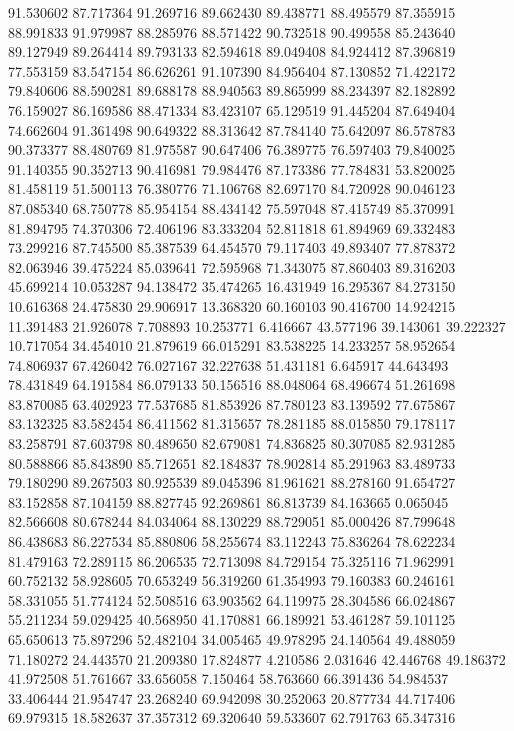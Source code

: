 91.530602
87.717364
91.269716
89.662430
89.438771
88.495579
87.355915
88.991833
91.979987
88.285976
88.571422
90.732518
90.499558
85.243640
89.127949
89.264414
89.793133
82.594618
89.049408
84.924412
87.396819
77.553159
83.547154
86.626261
91.107390
84.956404
87.130852
71.422172
79.840606
88.590281
89.688178
88.940563
89.865999
88.234397
82.182892
76.159027
86.169586
88.471334
83.423107
65.129519
91.445204
87.649404
74.662604
91.361498
90.649322
88.313642
87.784140
75.642097
86.578783
90.373377
88.480769
81.975587
90.647406
76.389775
76.597403
79.840025
91.140355
90.352713
90.416981
79.984476
87.173386
77.784831
53.820025
81.458119
51.500113
76.380776
71.106768
82.697170
84.720928
90.046123
87.085340
68.750778
85.954154
88.434142
75.597048
87.415749
85.370991
81.894795
74.370306
72.406196
83.333204
52.811818
61.894969
69.332483
73.299216
87.745500
85.387539
64.454570
79.117403
49.893407
77.878372
82.063946
39.475224
85.039641
72.595968
71.343075
87.860403
89.316203
45.699214
10.053287
94.138472
35.474265
16.431949
16.295367
84.273150
10.616368
24.475830
29.906917
13.368320
60.160103
90.416700
14.924215
11.391483
21.926078
7.708893
10.253771
6.416667
43.577196
39.143061
39.222327
10.717054
34.454010
21.879619
66.015291
83.538225
14.233257
58.952654
74.806937
67.426042
76.027167
32.227638
51.431181
6.645917
44.643493
78.431849
64.191584
86.079133
50.156516
88.048064
68.496674
51.261698
83.870085
63.402923
77.537685
81.853926
87.780123
83.139592
77.675867
83.132325
83.582454
86.411562
81.315657
78.281185
88.015850
79.178117
83.258791
87.603798
80.489650
82.679081
74.836825
80.307085
82.931285
80.588866
85.843890
85.712651
82.184837
78.902814
85.291963
83.489733
79.180290
89.267503
80.925539
89.045396
81.961621
88.278160
91.654727
83.152858
87.104159
88.827745
92.269861
86.813739
84.163665
0.065045
82.566608
80.678244
84.034064
88.130229
88.729051
85.000426
87.799648
86.438683
86.227534
85.880806
58.255674
83.112243
75.836264
78.622234
81.479163
72.289115
86.206535
72.713098
84.729154
75.325116
71.962991
60.752132
58.928605
70.653249
56.319260
61.354993
79.160383
60.246161
58.331055
51.774124
52.508516
63.903562
64.119975
28.304586
66.024867
55.211234
59.029425
40.568950
41.170881
66.189921
53.461287
59.101125
65.650613
75.897296
52.482104
34.005465
49.978295
24.140564
49.488059
71.180272
24.443570
21.209380
17.824877
4.210586
2.031646
42.446768
49.186372
41.972508
51.761667
33.656058
7.150464
58.763660
66.391436
54.984537
33.406444
21.954747
23.268240
69.942098
30.252063
20.877734
44.717406
69.979315
18.582637
37.357312
69.320640
59.533607
62.791763
65.347316
